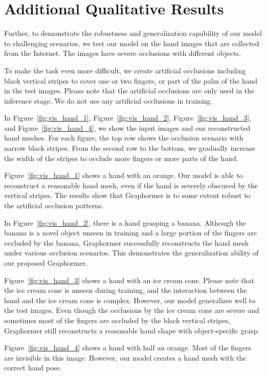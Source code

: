 \section{Additional Qualitative Results}

Further, to demonstrate the robustness and generalization capability of our model to challenging scenarios, we test our model on the hand images that are collected from the Internet. The images have severe occlusions with different objects. 

To make the task even more difficult, we create artificial occlusions including black vertical stripes to cover one or two fingers, or part of the palm of the hand in the test images. Please note that the artificial occlusions are only used in the inference stage. We do not use any artificial occlusions in training.

In Figure~\ref{fig:vis_hand_1}, Figure~\ref{fig:vis_hand_2}, Figure~\ref{fig:vis_hand_3}, and Figure~\ref{fig:vis_hand_4}, we show the input images and our reconstructed hand meshes. For each figure, the top row shows the occlusion scenario with narrow black stripes. From the second row to the bottom, we gradually increase the width of the stripes to occlude more fingers or more parts of the hand. 

Figure~\ref{fig:vis_hand_1} shows a hand with an orange. Our model is able to reconstruct a reasonable hand mesh, even if the hand is severely obscured by the vertical stripes. The results show that Graphormer is to some extent robust to the artificial occlusion patterns.

In Figure~\ref{fig:vis_hand_2}, there is a hand grasping a banana. Although the banana is a novel object unseen in training and a large portion of the fingers are occluded by the banana, Graphormer successfully reconstructs the hand mesh under various occlusion scenarios. This demonstrates the generalization ability of our proposed Graphormer.

Figure~\ref{fig:vis_hand_3} shows a hand with an ice cream cone. Please note that the ice cream cone is unseen during training, and the interaction between the hand and the ice cream cone is complex. However, our model generalizes well to the test images. Even though the occlusions by the ice cream cone are severe and sometimes most of the fingers are occluded by the black vertical stripes, Graphormer still reconstructs a reasonable hand shape with object-specific grasp. 

Figure~\ref{fig:vis_hand_4} shows a hand with half an orange. Most of the fingers are invisible in this image. However, our model creates a hand mesh with the correct hand pose.

